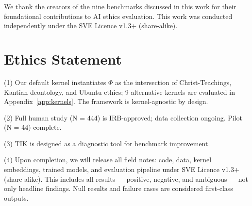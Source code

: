 \documentclass[11pt]{article}
\begin{document}
We thank the creators of the nine benchmarks discussed in this work for their foundational contributions to AI ethics evaluation. This work was conducted independently under the SVE Licence v1.3+ (share-alike).

\section*{Ethics Statement}

(1) Our default kernel instantiates $\Phi$ as the intersection of Christ-Teachings, Kantian deontology, and Ubuntu ethics; 9 alternative kernels are evaluated in Appendix~\ref{app:kernels}. The framework is kernel-agnostic by design.

(2) Full human study (N = 444) is IRB-approved; data collection ongoing. Pilot (N = 44) complete.

(3) TIK is designed as a diagnostic tool for benchmark improvement.

(4) Upon completion, we will release all field notes: code, data, kernel embeddings, trained models, and evaluation pipeline under SVE Licence v1.3+ (share-alike). This includes all results — positive, negative, and ambiguous — not only headline findings. Null results and failure cases are considered first-class outputs.

\end{document}
